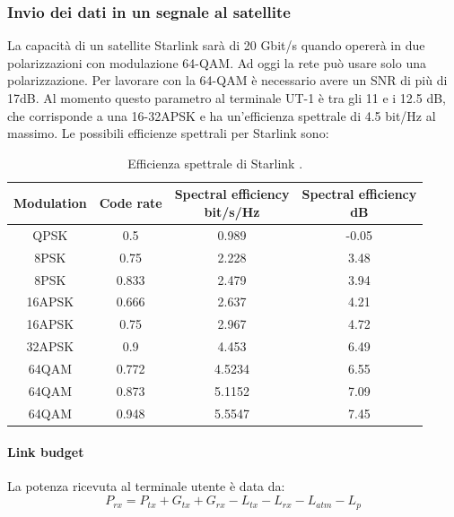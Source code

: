 \subsubsection{Invio dei dati in un segnale al satellite}
La capacità di un satellite Starlink sarà di 20 Gbit/s quando opererà in due polarizzazioni con modulazione 64-\ac{QAM}.
Ad oggi la rete può usare solo una polarizzazione.
Per lavorare con la 64-\ac{QAM} è necessario avere un \ac{SNR} di più di 17dB.
Al momento questo parametro al terminale UT-1 è tra gli 11 e i 12.5 dB, che corrisponde a una 16-32\ac{APSK} e ha un'efficienza spettrale di 4.5 bit/Hz al massimo.
Le possibili efficienze spettrali per Starlink sono:

\begin{table}[h]
\centering
\begin{tabular}{|c|c|c|c|}
\hline
\textbf{Modulation} & \textbf{Code rate} & \makecell{\textbf{Spectral efficiency}\\ \textbf{bit/s/Hz}} & \makecell{\textbf{Spectral efficiency} \\ \textbf{dB}}\\ \hline
QPSK     & 0.5   & 0.989  & -0.05 \\ \hline
8PSK     & 0.75  & 2.228  & 3.48  \\ \hline
8PSK     & 0.833 & 2.479  & 3.94  \\ \hline
16APSK   & 0.666 & 2.637  & 4.21  \\ \hline
16APSK   & 0.75  & 2.967  & 4.72  \\ \hline
32APSK   & 0.9   & 4.453  & 6.49  \\ \hline
64QAM    & 0.772 & 4.5234 & 6.55  \\ \hline
64QAM    & 0.873 & 5.1152 & 7.09  \\ \hline
64QAM    & 0.948 & 5.5547 & 7.45  \\ \hline
\end{tabular}
\caption{Efficienza spettrale di Starlink \cite{rozenvasser_estimation_2023}.}
\end{table}

\paragraph{Link budget}
La potenza ricevuta al terminale utente è data da:
\begin{equation}
P_{rx} = P_{tx} + G_{tx} + G_{rx} - L_{tx} - L_{rx} - L_{atm} - L_{p}
\label{eq:received-power}
\end{equation}

